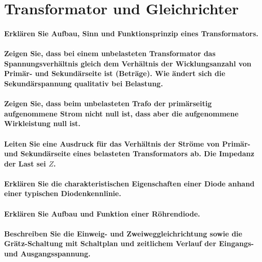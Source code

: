 \documentclass[a4paper, 11pt, parskip=half]{scrartcl}
\begin{document}
\newpage

\section{Transformator und Gleichrichter}

\paragraph{Erklären Sie Aufbau, Sinn und Funktionsprinzip eines Transformators.}

\paragraph{Zeigen Sie, dass bei einem unbelasteten Transformator das Spannungsverhältnis gleich dem
Verhältnis der Wicklungsanzahl von Primär- und Sekundärseite ist (Beträge). Wie ändert sich die
Sekundärspannung qualitativ bei Belastung.}

\paragraph{Zeigen Sie, dass beim unbelasteten Trafo der primärseitig aufgenommene Strom nicht null
ist, dass aber die aufgenommene Wirkleistung null ist.}

\paragraph{Leiten Sie eine Ausdruck für das Verhältnis der Ströme von Primär- und Sekundärseite
eines belasteten Transformators ab. Die Impedanz der Last sei $Z$.}

\paragraph{Erklären Sie die charakteristischen Eigenschaften einer Diode anhand einer typischen
Diodenkennlinie.}

\paragraph{Erklären Sie Aufbau und Funktion einer Röhrendiode.}

\paragraph{Beschreiben Sie die Einweig- und Zweiweggleichrichtung sowie die Grätz-Schaltung mit
Schaltplan und zeitlichem Verlauf der Eingangs- und Ausgangsspannung.}
\end{document}
